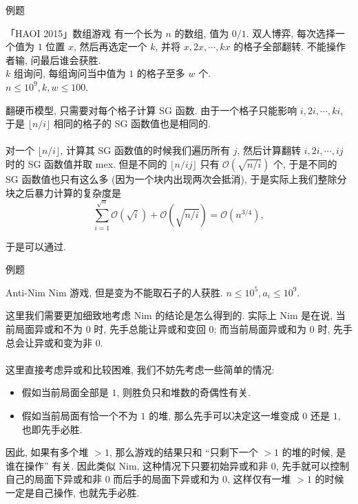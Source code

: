 \documentclass{beamer}
\newcommand{\nl}{\\\hspace*{\fill}\\}
\begin{document}
	\begin{frame}{例题}
		\begin{block}{「HAOI 2015」数组游戏}
			有一个长为 $n$ 的数组, 值为 $0/1$. 双人博弈, 每次选择一个值为 $1$ 位置 $x$, 然后再选定一个 $k$, 并将 $x,2x,\cdots,kx$ 的格子全部翻转. 不能操作者输, 问最后谁会获胜.\\
			$k$ 组询问, 每组询问当中值为 $1$ 的格子至多 $w$ 个.\\
			$n\leq 10^9,k,w\leq 100$.
		\end{block}
		\pause
		翻硬币模型, 只需要对每个格子计算 SG 函数. 由于一个格子只能影响 $i,2i,\cdots,ki$, 于是 $\lfloor n/i\rfloor$ 相同的格子的 SG 函数值也是相同的.\nl
		对一个 $\lfloor n/i\rfloor$, 计算其 SG 函数值的时候我们遍历所有 $j$, 然后计算翻转 $i,2i,\cdots,ij$ 时的 SG 函数值并取 mex. 但是不同的 $\lfloor n/ij\rfloor$ 只有 $\mathcal O(\sqrt{n/i})$ 个, 于是不同的 SG 函数值也只有这么多 (因为一个块内出现两次会抵消), 于是实际上我们整除分块之后暴力计算的复杂度是
		$$
		\sum_{i=1}^{\sqrt n}\mathcal O(\sqrt i)+\mathcal O(\sqrt{n/i})=\mathcal O(n^{3/4}),
		$$

		于是可以通过.
	\end{frame}

	\begin{frame}{例题}
		\begin{block}{Anti-Nim}
			Nim 游戏, 但是变为不能取石子的人获胜.
			$n\leq 10^5,a_i\leq 10^9$.
		\end{block}
		\pause
		这里我们需要更加细致地考虑 Nim 的结论是怎么得到的. 实际上 Nim 是在说, 当前局面异或和不为 $0$ 时, 先手总能让异或和变回 $0$; 而当前局面异或和为 $0$ 时, 先手总会让异或和变为非 $0$.\nl
		这里直接考虑异或和比较困难, 我们不妨先考虑一些简单的情况:\\
		\begin{itemize}
			\item 假如当前局面全部是 $1$, 则胜负只和堆数的奇偶性有关.\\
			\item 假如当前局面有恰一个不为 $1$ 的堆, 那么先手可以决定这一堆变成 $0$ 还是 $1$, 也即先手必胜.
		\end{itemize}
		因此, 如果有多个堆 $>1$, 那么游戏的结果只和 ``只剩下一个 $>1$ 的堆的时候, 是谁在操作'' 有关. 因此类似 Nim, 这种情况下只要初始异或和非 $0$, 先手就可以控制自己的局面下异或和非 $0$ 而后手的局面下异或和为 $0$, 这样仅有一堆 $>1$ 的时候一定是自己操作, 也就先手必胜.
	\end{frame}
\end{document}
